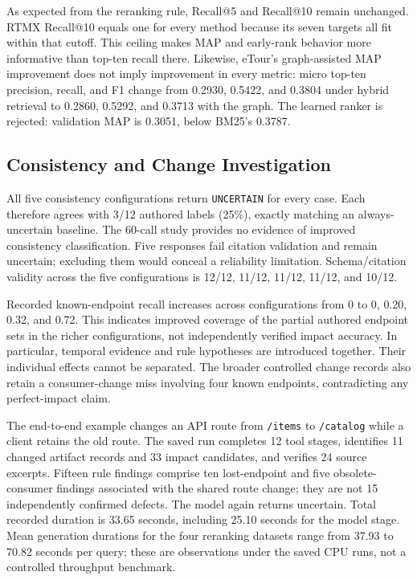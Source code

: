 \documentclass[conference,letterpaper,10pt]{IEEEtran}
\begin{document}
As expected from the reranking rule, Recall@5 and Recall@10 remain unchanged. RTMX Recall@10 equals one for every method because its seven targets all fit within that cutoff. This ceiling makes MAP and early-rank behavior more informative than top-ten recall there. Likewise, eTour's graph-assisted MAP improvement does not imply improvement in every metric: micro top-ten precision, recall, and F1 change from 0.2930, 0.5422, and 0.3804 under hybrid retrieval to 0.2860, 0.5292, and 0.3713 with the graph. The learned ranker is rejected: validation MAP is 0.3051, below BM25's 0.3787.

\subsection{Consistency and Change Investigation}
All five consistency configurations return \texttt{UNCERTAIN} for every case. Each therefore agrees with 3/12 authored labels (25\%), exactly matching an always-uncertain baseline. The 60-call study provides no evidence of improved consistency classification. Five responses fail citation validation and remain uncertain; excluding them would conceal a reliability limitation. Schema/citation validity across the five configurations is 12/12, 11/12, 11/12, 11/12, and 10/12.

Recorded known-endpoint recall increases across configurations from 0 to 0, 0.20, 0.32, and 0.72. This indicates improved coverage of the partial authored endpoint sets in the richer configurations, not independently verified impact accuracy. In particular, temporal evidence and rule hypotheses are introduced together. Their individual effects cannot be separated. The broader controlled change records also retain a consumer-change miss involving four known endpoints, contradicting any perfect-impact claim.

The end-to-end example changes an API route from \texttt{/items} to \texttt{/catalog} while a client retains the old route. The saved run completes 12 tool stages, identifies 11 changed artifact records and 33 impact candidates, and verifies 24 source excerpts. Fifteen rule findings comprise ten lost-endpoint and five obsolete-consumer findings associated with the shared route change; they are not 15 independently confirmed defects. The model again returns uncertain. Total recorded duration is 33.65 seconds, including 25.10 seconds for the model stage. Mean generation durations for the four reranking datasets range from 37.93 to 70.82 seconds per query; these are observations under the saved CPU runs, not a controlled throughput benchmark.
\end{document}

